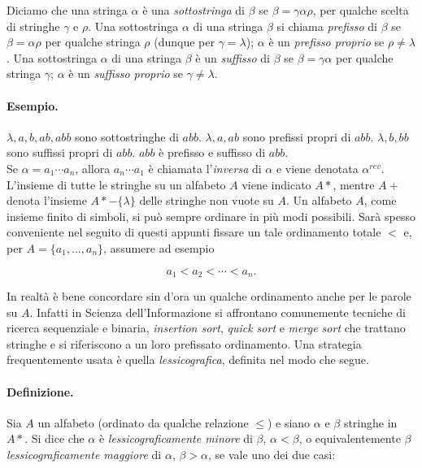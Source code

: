 Diciamo che una stringa $\alpha$ è una \textit{sottostringa}
di $\beta$ se $\beta = \gamma\alpha\rho$, per qualche scelta
di stringhe $\gamma$ e $\rho$. Una sottostringa $\alpha$
di una stringa $\beta$ si chiama \textit{prefisso} di $\beta$ se
$\beta = \alpha\rho$ per qualche stringa $\rho$ (dunque per $\gamma = \lambda$);
$\alpha$ è un \textit{prefisso proprio} se
$\rho \neq \lambda$. Una sottostringa $\alpha$ di una stringa $\beta$
è un \textit{suffisso} di $\beta$ se $\beta = \gamma\alpha$ per
qualche stringa $\gamma$; $\alpha$ è un \textit{suffisso proprio} se $\gamma \neq \lambda$.

\paragraph{Esempio.}
$\lambda, a, b, ab, abb$ sono sottostringhe di $abb$. $\lambda, a, ab$ sono prefissi
propri di $abb$. $\lambda, b, bb$ sono suffissi propri di $abb$.
$abb$ è prefisso e suffisso di $abb$.\\

Se $\alpha = a_1 \cdots a_n$, allora $a_n \cdots a_1$ è chiamata
l'\textit{inversa} di $\alpha$ e viene denotata $\alpha^{rev}$.
L'insieme di tutte le stringhe su un alfabeto $A$ viene indicato $A*$,
mentre $A+$ denota l'insieme $A* - \{\lambda\}$ delle stringhe non vuote su $A$.
Un alfabeto $A$, come insieme finito di simboli, si può sempre ordinare in più
modi possibili. Sarà spesso conveniente nel seguito di questi appunti fissare
un tale ordinamento totale $<$ e, per $A = \{a_1, ...,a_n\}$, assumere ad esempio

\[
    a_1 < a_2 < \cdots < a_n.
\]

In realtà è bene concordare sin d'ora un qualche ordinamento anche per
le parole su $A$. Infatti in Scienza dell'Informazione si affrontano
comunemente tecniche di ricerca sequenziale e binaria,
\textit{insertion sort}, \textit{quick sort} e \textit{merge sort} che
trattano stringhe e si riferiscono a un loro prefissato ordinamento. Una strategia
frequentemente usata è quella \textit{lessicografica}, definita nel modo che segue.

\paragraph{Definizione.}
Sia $A$ un alfabeto (ordinato da qualche relazione $\le$) e siano $\alpha$ e
$\beta$ stringhe in $A*$. Si dice che $\alpha$ è \textit{lessicograficamente minore}
di $\beta$, $\alpha < \beta$, o
equivalentemente $\beta$ \textit{lessicograficamente maggiore} di $\alpha$,
$\beta > \alpha$, se vale uno dei due casi:

